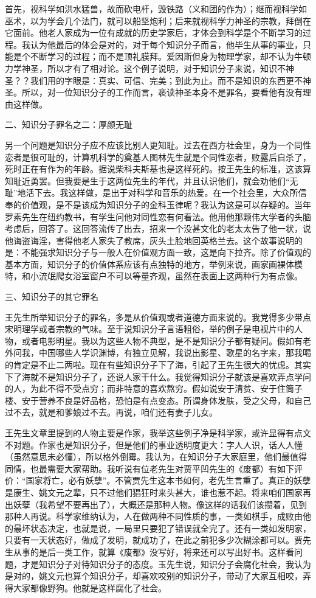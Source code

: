 首先，视科学如洪水猛兽，故而砍电杆，毁铁路（义和团的作为）；继而视科学如巫术，以为学会几个法门，就可以船坚炮利；后来就视科学力神圣的宗教，拜倒在它面前。他老人家成为一位有成就的历史学家后，才体会到科学是个不断学习的过程。我认为他最后的体会是对的，对于每个知识分子而言，他毕生从事的事业，只能是个不断学习的过程；而不是顶礼膜拜。爱因斯但身为物理学家，却不认为牛顿力学神圣，所以才有了相对论。这个例子说明，对于知识分子来说，知识不神圣？？我们用的字眼是：真实、可信、完美；到此为止。而不是知识的东西更不神圣。所以，对一位知识分子的工作而言，亵读神圣本身不是罪名，要看他有没有理由这样做。 

二、知识分子罪名之二：厚颜无耻 

另一个问题是知识分子应不应该比别人更知耻。过去在西方社会里，身为一个同性恋者是很可耻的，计算机科学的奠基人图林先生就是个同性恋者，败露后自杀了，死时正在有作为的年龄。据说柴科夫斯基也是这样死的。按王先生的标准，这该算知耻近勇罢。但我要是生于这两位先生的年代，并且认识他们，就会劝他们“无耻”地活下去。我这样做，是出于对科学和音乐的热爱。在一个社会里，大众所信奉的价值观，是不是该成为知识分子的金科玉律呢？我认为这是可以存疑的。当年罗素先生在纽约教书，有学生问他对同性恋有何看法。他用他那颗伟大学者的头脑考虑后，回答了。这回答流传了出去，招来一个没甚文化的老太太告了他一状，说他诲盗诲淫，害得他老人家失了教席，灰头土脸地回英格兰去。这个故事说明的是：不能强求知识分子与一般人在价值观方面一致，这是向下拉齐。除了价值观的基本方面，知识分子的价值体系应该有点独特的地方，举例来说，画家画裸体模特，和小流氓爬女浴室窗户不可以等量齐观，虽然在表面上这两种行为有点像。 

三、知识分子的其它罪名 

王先生所举知识分子的罪名，多是从价值观或者道德方面来说的。我党得多少带点宋明理学或者宗教的气味。至于说知识分子言语粗俗，举的例子是电视片中的人物，或者电影明星。我以为这些人物不典型，是不是知识分子都有疑问。假如有老外问我，中国哪些人学识渊博，有独立见解，我说出影星、歌星的名字来，那我喝的肯定是不止二两啦。现在有些知识分子下了海，引起了王先生很大的忧虑。其实下了海就不是知识分子了，还说人家干什么。我觉得知识分子就该是喜欢弄点学问的人，为此不得不受点穷；而非特意的喜欢熬穷。假如说安于清贫、安于住筒子楼、安于营养不良是好品格，恐怕是有点变态。所谓身体发肤，受之父母，和自己过不去，就是和爹娘过不去。再说，咱们还有妻子儿女。 

王先生文章里提到的人物主要是作家，我举这些例子净是科学家，或许显得有点文不对题。作家也是知识分子，但是他们的事业透明度更大：字人人识，话人人懂（虽然意思未必懂），所以格外倒霉。我认为，在知识分子大家庭里，他们最值得同情，也最需要大家帮助。我听说有位老先生对贾平凹先生的《废都）有如下评价：“国家将亡，必有妖孽”。不管贾先生这本书如何，老先生言重了。真正的妖孽是康生、姚文元之辈，只不过他们猖狂时来头甚大，谁也惹不起。将来咱们国家再出妖孽（我希望不要再出了），大概还是那种人物。像这样的话我们该攒着，见到那种人再说。科学家维纳认为，人在做两种不同性质的事，一类如棋手，成败由他的最坏状态决定，也就是说，一局里只要犯了错误就全完了。还有一类如发明家，只要有一天状态好，做成了发明，就成功了，在此之前犯多少次糊涂都可以。贾先生从事的是后一类工作，就算《废都》没写好，将来还可以写出好书。这样看问题，才是知识分子对待知识分子的态度。玉先生说，知识分子会腐化社会，我认为是对的，姚文元也算个知识分子，却喜欢咬别的知识分子，带动了大家互相咬，弄得大家都像野狗。他就是这样腐化了社会。 

